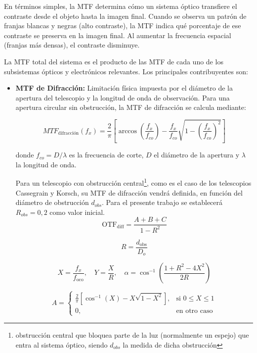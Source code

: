 En términos simples, la MTF determina cómo un sistema óptico transfiere el contraste desde el objeto hasta la imagen final. Cuando se observa un patrón de franjas blancas y negras (alto contraste), la MTF indica qué porcentaje de ese contraste se preserva en la imagen final. Al aumentar la frecuencia espacial (franjas más densas), el contraste disminuye.


La MTF total del sistema es el producto de las MTF de cada uno de los subsistemas ópticos y electrónicos relevantes. Los principales contribuyentes son:

\begin{itemize}
  \item \textbf{MTF de Difracción:} Limitación física impuesta por el diámetro de la apertura del telescopio y la longitud de onda de observación. Para una apertura circular sin obstrucción, la MTF de difracción se calcula mediante:

  \begin{equation}
  MTF_{\text{difracción}}(f_x) = \frac{2}{\pi} \left[ \arccos\left(\frac{f_x}{f_{co}}\right) - \frac{f_x}{f_{co}} \sqrt{1 - \left(\frac{f_x}{f_{co}}\right)^2} \right]
  \end{equation}

  donde $f_{co} = D / \lambda$ es la frecuencia de corte, $D$ el diámetro de la apertura y $\lambda$ la longitud de onda.

  Para un telescopio con obstrucción central\footnote{obstrucción central que bloquea parte de la luz (normalmente un espejo) que entra al sistema óptico, siendo $d_{obs}$ la medida de dicha obstrucción}, como es el caso de los telescopios Cassegrain y Korsch, su MTF de difracción vendrá definida, en función del diámetro de obstrucción $d_{obs}$. Para el presente trabajo se establecerá $R_{obs} = 0,2$ como valor inicial.\cite{Foadi2023DesigningCT}
\begin{equation}
\mathrm{OTF}_{\mathrm{diff}} = \frac{A + B + C}{1 - R^2}
\end{equation}

\begin{equation}\label{eq:mtfrobs}
R = \frac{d_{\mathrm{obs}}}{D_o}
\end{equation}

\begin{equation}
X = \frac{f_x}{f_{\mathrm{oco}}}, \quad Y = \frac{X}{R}, \quad \alpha = \cos^{-1}\left(\frac{1 + R^2 - 4X^2}{2R}\right)
\end{equation}

\begin{equation}
A =
\begin{cases}
\frac{2}{\pi}\left[\cos^{-1}(X) - X\sqrt{1 - X^2}\right], & \text{si } 0 \leq X \leq 1 \\
0, & \text{en otro caso}
\end{cases}
\end{equation}


\end{itemize}
